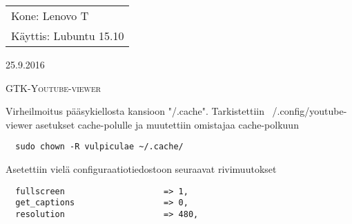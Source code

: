 \documentclass[main.tex]{subfiles}
\begin{document}
\thispagestyle{empty}
\begin{tabular}[t]{l}
Kone: Lenovo T\\
Käyttis: Lubuntu 15.10
\end{tabular}
\hfill 25.9.2016

{\scshape\Large{GTK-Youtube-viewer}}

Virheilmoitus pääsykiellosta kansioon "/.cache". Tarkistettiin ~/.config/youtube-viewer asetukset cache-polulle ja muutettiin omistajaa cache-polkuun

\begin{lstlisting}
  sudo chown -R vulpiculae ~/.cache/
\end{lstlisting}

Asetettiin vielä configuraatiotiedostoon seuraavat rivimuutokset

\begin{lstlisting}
  fullscreen                    => 1,
  get_captions                  => 0,
  resolution                    => 480,
\end{lstlisting}
\end{document}
